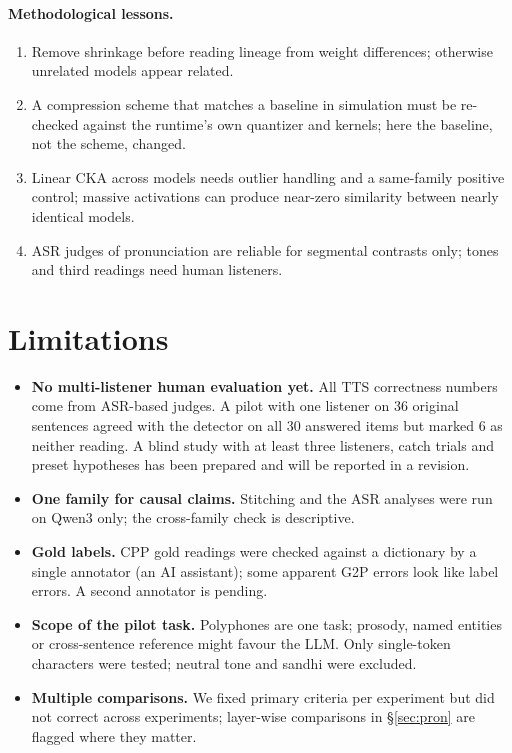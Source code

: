 \documentclass[11pt]{article}
\begin{document}
\paragraph{Methodological lessons.}
\begin{enumerate}
  \item Remove shrinkage before reading lineage from weight differences; otherwise unrelated models appear related.
  \item A compression scheme that matches a baseline in simulation must be re-checked against the runtime's own quantizer and kernels; here the baseline, not the scheme, changed.
  \item Linear CKA across models needs outlier handling and a same-family positive control; massive activations can produce near-zero similarity between nearly identical models.
  \item ASR judges of pronunciation are reliable for segmental contrasts only; tones and third readings need human listeners.
\end{enumerate}

\section{Limitations}
\begin{itemize}
  \item \textbf{No multi-listener human evaluation yet.} All TTS correctness numbers come from ASR-based judges. A pilot with one listener on 36 original sentences agreed with the detector on all 30 answered items but marked 6 as neither reading. A blind study with at least three listeners, catch trials and preset hypotheses has been prepared and will be reported in a revision.
  \item \textbf{One family for causal claims.} Stitching and the ASR analyses were run on Qwen3 only; the cross-family check is descriptive.
  \item \textbf{Gold labels.} CPP gold readings were checked against a dictionary by a single annotator (an AI assistant); some apparent G2P errors look like label errors. A second annotator is pending.
  \item \textbf{Scope of the pilot task.} Polyphones are one task; prosody, named entities or cross-sentence reference might favour the LLM. Only single-token characters were tested; neutral tone and sandhi were excluded.
  \item \textbf{Multiple comparisons.} We fixed primary criteria per experiment but did not correct across experiments; layer-wise comparisons in \S\ref{sec:pron} are flagged where they matter.
\end{itemize}
\end{document}
